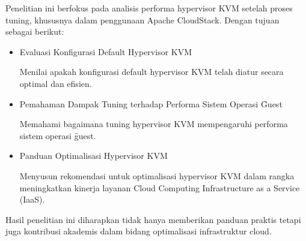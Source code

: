 Penelitian ini berfokus pada analisis performa hypervisor KVM setelah proses tuning, khususnya dalam penggunaan Apache CloudStack. Dengan tujuan sebagai berikut:

\begin{itemize}
	\item Evaluasi Konfigurasi Default Hypervisor KVM
	
	Menilai apakah konfigurasi default hypervisor KVM telah diatur secara optimal dan efisien.
	
	\item Pemahaman Dampak Tuning terhadap Performa Sistem Operasi \f{Guest}
	
	Memahami bagaimana tuning hypervisor KVM mempengaruhi performa sistem operasi \f{guest}.
	
	\item Panduan Optimalisasi Hypervisor KVM
	
	Menyusun rekomendasi untuk optimalisasi hypervisor KVM dalam rangka meningkatkan kinerja layanan Cloud Computing Infrastructure as a Service (IaaS).
\end{itemize}
Hasil penelitian ini diharapkan tidak hanya memberikan panduan praktis tetapi juga kontribusi akademis dalam bidang optimalisasi infrastruktur cloud.

